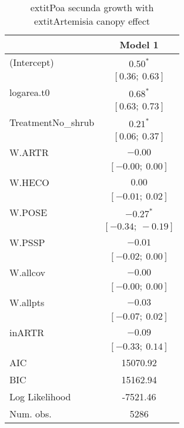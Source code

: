 \begin{table}
\caption{	extit{Poa secunda} growth with 	extit{Artemisia} canopy effect}
\begin{center}
\begin{tabular}{l c }
\hline
 & Model 1 \\
\hline
(Intercept)                      & $0.50^{*}$        \\
                                 & $[0.36;\ 0.63]$   \\
logarea.t0                       & $0.68^{*}$        \\
                                 & $[0.63;\ 0.73]$   \\
TreatmentNo\_shrub               & $0.21^{*}$        \\
                                 & $[0.06;\ 0.37]$   \\
W.ARTR                           & $-0.00$           \\
                                 & $[-0.00;\ 0.00]$  \\
W.HECO                           & $0.00$            \\
                                 & $[-0.01;\ 0.02]$  \\
W.POSE                           & $-0.27^{*}$       \\
                                 & $[-0.34;\ -0.19]$ \\
W.PSSP                           & $-0.01$           \\
                                 & $[-0.02;\ 0.00]$  \\
W.allcov                         & $-0.00$           \\
                                 & $[-0.00;\ 0.00]$  \\
W.allpts                         & $-0.03$           \\
                                 & $[-0.07;\ 0.02]$  \\
inARTR                           & $-0.09$           \\
                                 & $[-0.33;\ 0.14]$  \\
\hline
AIC                              & 15070.92          \\
BIC                              & 15162.94          \\
Log Likelihood                   & -7521.46          \\
Num. obs.                        & 5286              \\

\end{tabular}
\end{center}
\end{table}
